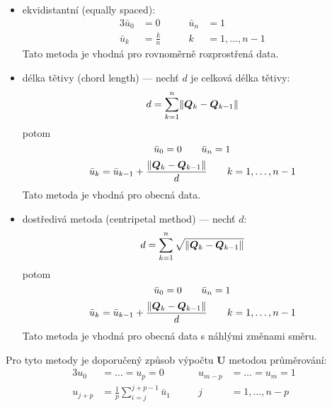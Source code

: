 \begin{itemize}
    \item ekvidistantní (equally spaced):
          \begin{alignat}{3}
              \bar{u}_0 & = 0           \quad\quad & \bar{u}_n & =1                 \\
              \bar{u}_k & = \frac{k}{n} \quad\quad & k         & = 1, \ldots, n - 1
          \end{alignat}
          Tato metoda je vhodná pro rovnoměrně rozprostřená data.
    \item délka tětivy (chord length) --- nechť $d$ je celková délka tětivy:
          \begin{equation}
              d = \sum_{k = 1}^{n}\lVert\bm{Q}_k - \bm{Q}_{k - 1}\rVert
          \end{equation}
          potom
          \begin{equation}
              \bar{u}_0 = 0 \quad\quad \bar{u}_n = 1\\
          \end{equation}
          \begin{equation}
              \bar{u}_k = \bar{u}_{k - 1} + \frac{\lVert\bm{Q}_k - \bm{Q}_{k - 1}\rVert}{d}
              \quad\quad k=1,\ldots,n-1
              \label{eq:chord length}
          \end{equation}
          Tato metoda je vhodná pro obecná data.
    \item dostředivá metoda (centripetal method) --- nechť $d$:
          \begin{equation}
              d = \sum_{k = 1}^{n}\sqrt{\lVert\bm{Q}_k - \bm{Q}_{k - 1}\rVert}
          \end{equation}
          potom
          \begin{equation}
              \bar{u}_0 = 0 \quad\quad \bar{u}_n = 1\\
          \end{equation}
          \begin{equation}
              \bar{u}_k = \bar{u}_{k - 1} + \frac{\lVert\bm{Q}_k - \bm{Q}_{k - 1}\rVert}{d}
              \quad\quad k=1,\ldots,n-1
              \label{eq:centripetal method}
          \end{equation}
          Tato metoda je vhodná pro obecná data s náhlými změnami směru.
\end{itemize}
Pro tyto metody je doporučený způsob výpočtu $\bm{U}$ metodou průměrování:
\begin{alignat}{3}
    u_0     & = \ldots = u_p = 0 \quad\quad                      & u_{m-p} & = \ldots = u_m = 1 \nonumber                             \\
    u_{j+p} & =\frac{1}{p}\sum_{i=j}^{j+p-1}\bar{u}_1 \quad\quad & j       & =1,\ldots, n -p    \label{eq:uzlový vektor průměrováním}
\end{alignat}
